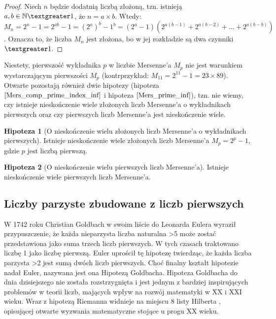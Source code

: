 \documentclass[10pt,onecolumn]{article}
\theoremstyle{definition}
\theoremstyle{hypothesis}
\newtheorem{hypothesis}{Hipoteza}
\theoremstyle{capability}
\begin{document}
\begin{proof}
Niech $n$ będzie dodatnią liczbą złożoną, tzn. istnieją $a, b \in \mathbb{N} \textgreater 1$, że $n = a \times b$. Wtedy: $M_n = 2^n - 1 = 2^{ab} - 1 = (2^a)^b - 1^b = (2^a - 1)(2^{a(b - 1)} + 2^{a(b - 2)} + \ldots + 2^{a(b-b)})$. Oznacza to, że liczba $M_n$ jest złożona, bo w jej rozkładzie są dwa czynniki $\textgreater 1$.
\end{proof}

Niestety, pierwszość wykładnika $p$ w liczbie Mersenne'a $M_p$ nie jest warunkiem wystarczającym pierwszości $M_p$ (kontrprzykład: $M_{11} = 2^{11} - 1 = 23 \times 89$). Otwarte pozostają również dwie hipotezy (hipoteza $\ref{Mers_comp_prime_index_inf}$ i hipoteza $\ref{Mers_prime_inf}$), tzn. nie wiemy, czy istnieje nieskończenie wiele złożonych liczb Mersenne'a o wykładnikach pierwszych oraz czy pierwszych liczb Mersenne'a jest nieskończenie wiele.

\begin{hypothesis}[O nieskończenie wielu złożonych liczb Mersenne'a o wykładnikach pierwszych]
Istnieje nieskończenie wiele złożonych liczb Mersenne'a $M_p = 2^p - 1$, gdzie $p$ jest liczbą pierwszą.
\label{Mers_comp_prime_index_inf}
\end{hypothesis}

\begin{hypothesis}[O nieskończenie wielu pierwszych liczb Mersenne'a]
Istnieje nieskończenie wiele pierwszych liczb Mersenne'a.
\label{Mers_prime_inf}
\end{hypothesis}

\subsection{Liczby parzyste zbudowane z liczb pierwszych}

W 1742 roku Christian Goldbach w swoim liście do Leonarda Eulera \cite{goldbach1742} wyraził przypuszczenie, że każda nieparzysta liczba naturalna \textgreater 5 może zostać przedstawiona jako suma trzech liczb pierwszych. W tych czasach traktowano liczbę 1 jako liczbę pierwszą. Euler uprościł tę hipotezę twierdząc, że każda liczba parzysta \textgreater 2 jest sumą dwóch liczb pierwszych. Choć finalny kształt hipotezie nadał Euler, nazywana jest ona Hipotezą Goldbacha. Hipoteza Goldbacha do dnia dzisiejszego nie została rozstrzygnięta i jest jednym z bardziej inspirujących problemów w teorii liczb, mających wpływ na rozwój matematyki w XX i XXI wieku. Wraz z hipotezą Riemanna widnieje na miejscu 8 listy Hilberta \cite{hilbert1900}, opisującej otwarte wyzwania matematyczne stojące u progu XX wieku.
\end{document}
